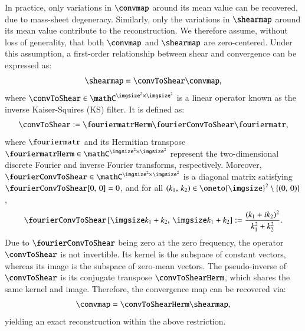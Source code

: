 \documentclass{aa}
\begin{document}
In practice, only variations in $\convmap$ around its mean value can be recovered, due to mass-sheet degeneracy. Similarly, only the variations in $\shearmap$ around its mean value contribute to the reconstruction. We therefore assume, without loss of generality, that both $\convmap$ and $\shearmap$ are zero-centered. Under this assumption, a first-order relationship between shear and convergence can be expressed as:
\begin{equation}
    \shearmap = \convToShear \convmap,
\label{eq:invprob0}
\end{equation}
where $\convToShear \in \mathC^{\imgsize^2 \times \imgsize^2}$ is a linear operator known as the inverse Kaiser-Squires (KS) filter. It is defined as:
\begin{equation}
    \convToShear := \fouriermatrHerm\fourierConvToShear\fouriermatr,
\end{equation}
where $\fouriermatr$ and its Hermitian transpose $\fouriermatrHerm \in \mathC^{\imgsize^2 \times \imgsize^2}$ represent the two-dimensional discrete Fourier and inverse Fourier transforms, respectively. Moreover, $\fourierConvToShear \in \mathC^{\imgsize^2 \times \imgsize^2}$ is a diagonal matrix satisfying $\fourierConvToShear[0,\, 0] = 0$, and for all $(k_1,\, k_2) \in \oneto{\imgsize}^2 \setminus \{(0,\, 0)\}$,%
\begin{equation}
    \fourierConvToShear\left[
        \imgsize k_1 + k_2,\, \imgsize k_1 + k_2
    \right] := \frac{(k_1 + i k_2)^2}{k_1^2 + k_2^2}.
\end{equation}
Due to $\fourierConvToShear$ being zero at the zero frequency, the operator $\convToShear$ is not invertible. Its kernel is the subspace of constant vectors, whereas its image is the subspace of zero-mean vectors. The pseudo-inverse of $\convToShear$ is its conjugate transpose $\convToShearHerm$, which shares the same kernel and image. Therefore, the convergence map can be recovered via:
\begin{equation}
    \convmap = \convToShearHerm \shearmap,
\end{equation}
yielding an exact reconstruction within the above restriction.
\end{document}

